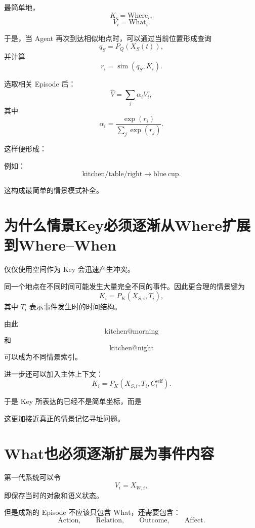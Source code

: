 最简单地，
\[
K_i=\mathrm{Where}_i,
\]
\[
V_i=\mathrm{What}_i.
\]

于是，当 Agent 再次到达相似地点时，可以通过当前位置形成查询
\[
q_S=P_Q(X_S(t)),
\]
并计算
\[
r_i
=
\operatorname{sim}(q_S,K_i).
\]

选取相关 Episode 后：
\[
\hat V
=
\sum_i
\alpha_i V_i,
\]
其中
\[
\alpha_i
=
\frac{\exp(r_i)}
{\sum_j\exp(r_j)}.
\]

这样便形成：
\begin{statementbox}
\centering
{}
\end{statementbox}

例如：
\[
\mathrm{kitchen/table/right}
\rightarrow
\mathrm{blue\ cup}.
\]

这构成最简单的情景模式补全。

\section{为什么情景Key必须逐渐从Where扩展到Where--When}

仅仅使用空间作为 Key 会迅速产生冲突。

同一个地点在不同时间可能发生大量完全不同的事件。因此更合理的情景键为
\[
\boxed{
K_i
=
P_K
(
X_{S,i},
T_i
),
}
\]
其中 $T_i$ 表示事件发生时的时间结构。

由此
\[
\mathrm{kitchen@morning}
\]
和
\[
\mathrm{kitchen@night}
\]
可以成为不同情景索引。

进一步还可以加入主体上下文：
\[
\boxed{
K_i
=
P_K
(
X_{S,i},
T_i,
C^{\mathrm{self}}_i
).
}
\]

于是 Key 所表达的已经不是简单坐标，而是
\begin{statementbox}
\centering
{}
\end{statementbox}

这更加接近真正的情景记忆寻址问题。

\section{What也必须逐渐扩展为事件内容}

第一代系统可以令
\[
V_i=X_{W,i},
\]
即保存当时的对象和语义状态。

但是成熟的 Episode 不应该只包含 What，还需要包含：
\[
\mathrm{Action},
\qquad
\mathrm{Relation},
\qquad
\mathrm{Outcome},
\qquad
\mathrm{Affect}.
\]

